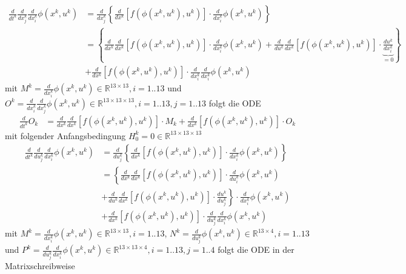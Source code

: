 \documentclass[12pt, a4paper]{scrartcl}
\begin{document}
\begin{align*}
\frac{d}{dt^k} \frac{d}{dx^k_j} \frac{d}{dx^k_i} \phi(x^k, u^k) &= \frac{d}{dx^k_j} \left\{ \frac{d}{dx^k} \left[f(\phi(x^k, u^k), u^k) \right] \cdot \frac{d}{dx^k_i}\phi(x^k, u^k) \right\}\\
&=\left\{\frac{d}{dx^k} \frac{d}{dx^k} \left[f(\phi(x^k, u^k), u^k) \right] \cdot \frac{d}{dx^k_i}\phi(x^k, u^k) + \frac{d}{du^k} \frac{d}{dx^k} \left[ f(\phi(x^k, u^k), u^k)  \right] \cdot \underbrace{\frac{du^k}{dx^k_i}}_{=0} \right\} \\
&+ \frac{d}{dx^k} \left[f(\phi(x^k, u^k), u^k) \right] \cdot \frac{d}{dx^k_i} \frac{d}{dx^k_i}\phi(x^k, u^k)
\end{align*}
mit $M^k = \frac{d}{dx^k_i} \phi(x^k, u^k) \in \mathbb{R}^{13 \times 13}, i = 1..13$ und $O^k = \frac{d}{dx^k_i} \frac{d}{dx^k_j} \phi(x^k, u^k) \in \mathbb{R}^{13 \times 13 \times 13}, i = 1..13, j=1..13$  folgt die ODE 
\begin{align*}
\frac{d}{dt^k} O_k &=\frac{d}{dx^k} \frac{d}{dx^k} \left[f(\phi(x^k, u^k), u^k) \right] \cdot M_k + \frac{d}{dx^k} \left[f(\phi(x^k, u^k), u^k) \right] \cdot O_k
\end{align*}
mit folgender Anfangsbedingung $H_0^k = 0 \in \mathbb{R}^{13 \times 13 \times 13}$
\begin{align*}
\frac{d}{dt^k} \frac{d}{du^k_j} \frac{d}{dx^k_i} \phi(x^k, u^k) &= \frac{d}{du^k_j} \left\{ \frac{d}{dx^k} \left[f(\phi(x^k, u^k), u^k) \right] \cdot \frac{d}{dx^k_i}\phi(x^k, u^k) \right\}\\
&= \left\{ \frac{d}{dx^k} \frac{d}{dx^k} \left[f(\phi(x^k, u^k), u^k) \right] \cdot \frac{d}{du^k_i}\phi(x^k, u^k) \right. \\
& \left. + \frac{d}{du^k} \frac{d}{dx^k} \left[f(\phi(x^k, u^k), u^k) \right] \cdot \frac{du^k}{du_j^k} \right\} \cdot \frac{d}{dx^k_i}\phi(x^k, u^k) \\
&+ \frac{d}{dx^k} \left[f(\phi(x^k, u^k), u^k)\right] \cdot \frac{d}{du^k_j} \frac{d}{dx^k_i}\phi(x^k, u^k) 
\end{align*}
mit $M^k = \frac{d}{dx^k_i} \phi(x^k, u^k) \in \mathbb{R}^{13 \times 13}, i = 1..13$, $N^k = \frac{d}{du^k_j} \phi(x^k, u^k) \in \mathbb{R}^{13 \times 4}, i = 1..13$ und $P^k = \frac{d}{du^k_j} \frac{d}{dx^k_i} \phi(x^k, u^k) \in \mathbb{R}^{13 \times 13 \times 4}, i = 1..13, j = 1..4$  folgt die ODE in der Matrixschreibweise
\end{document}
